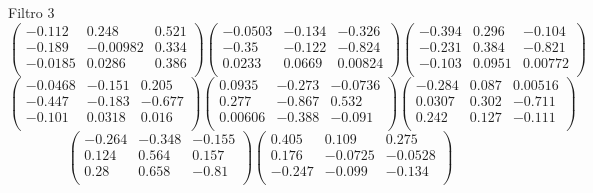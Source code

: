 Filtro 3
{ \small
\[
\begin{pmatrix}
  -0.112 & 0.248 & 0.521 \\
  -0.189 & -0.00982 & 0.334 \\
  -0.0185 & 0.0286 & 0.386 \\
\end{pmatrix}
\begin{pmatrix}
  -0.0503 & -0.134 & -0.326 \\
  -0.35 & -0.122 & -0.824 \\
  0.0233 & 0.0669 & 0.00824 \\
\end{pmatrix}
\begin{pmatrix}
  -0.394 & 0.296 & -0.104 \\
  -0.231 & 0.384 & -0.821 \\
  -0.103 & 0.0951 & 0.00772 \\
\end{pmatrix}
\]
\[
\begin{pmatrix}
  -0.0468 & -0.151 & 0.205 \\
  -0.447 & -0.183 & -0.677 \\
  -0.101 & 0.0318 & 0.016 \\
\end{pmatrix}
\begin{pmatrix}
  0.0935 & -0.273 & -0.0736 \\
  0.277 & -0.867 & 0.532 \\
  0.00606 & -0.388 & -0.091 \\
\end{pmatrix}
\begin{pmatrix}
  -0.284 & 0.087 & 0.00516 \\
  0.0307 & 0.302 & -0.711 \\
  0.242 & 0.127 & -0.111 \\
\end{pmatrix}
\]
\[
\begin{pmatrix}
  -0.264 & -0.348 & -0.155 \\
  0.124 & 0.564 & 0.157 \\
  0.28 & 0.658 & -0.81 \\
\end{pmatrix}
\begin{pmatrix}
  0.405 & 0.109 & 0.275 \\
  0.176 & -0.0725 & -0.0528 \\
  -0.247 & -0.099 & -0.134 \\
\end{pmatrix}
\]
}

